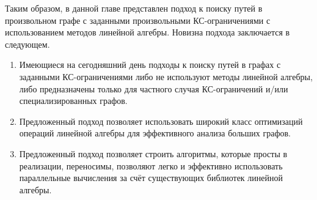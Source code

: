 Таким образом, в данной главе представлен подход к поиску путей в произвольном графе с заданными произвольными КС-ограничениями с использованием методов линейной алгебры. Новизна подхода заключается в следующем.
\begin{enumerate}
    \item Имеющиеся на сегодняшний день подходы к поиску путей в графах с заданными КС-ограничениями либо не используют методы линейной алгебры, либо предназначены только для частного случая КС-ограничений и/или специализированных графов.
    \item Предложенный подход позволяет использовать широкий класс оптимизаций операций линейной алгебры для эффективного анализа больших графов.
    \item Предложенный подход позволяет строить алгоритмы, которые просты в реализации, переносимы, позволяют легко и эффективно использовать параллельные вычисления за счёт существующих библиотек линейной алгебры.
\end{enumerate}

\FloatBarrier
